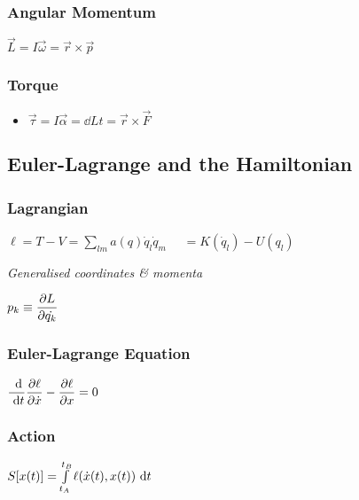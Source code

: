 \subsubsection{Angular Momentum}
\begin{itemize}
\itemt \( \vec{L} = I\vec{\omega} = \vec{r} \times \vec{p}\)
\end{itemize}

\subsubsection{Torque}
\begin{itemize}
\item \( \vec{\tau} = I\vec{\alpha} = \dd{L}{t} = \vec{r} \times \vec{F}\)
\end{itemize}

\subsection{Euler-Lagrange and the Hamiltonian}	

\subsubsection{Lagrangian}			
\begin{itemize}
\itemt \(\ell = T - V = \sum\limits_{lm} a(q)\dot{q}_l\dot{q}_m \)
\itemt \ \ \( = K(\dot{q}_l) - U(q_l)\)
\end{itemize}

\textit{Generalised coordinates \& momenta}
\begin{itemize}
\itemt \( p_k \equiv \dfrac{\partial L}{\partial \dot{q_k}}\)
\end{itemize}

\subsubsection{Euler-Lagrange Equation}			
\begin{itemize}
\itemt \( \dd{}{t} \pp{\ell}{\dot{x}} - \pp{\ell}{x} = 0\)
\end{itemize}

\subsubsection{Action}			
\begin{itemize}
\itemt \(S[x(t)] = \int\limits_{t_A}^{t_B} \ell(\dot{x}(t),x(t)) \ \mathrm{d}t\)
\end{itemize}			

